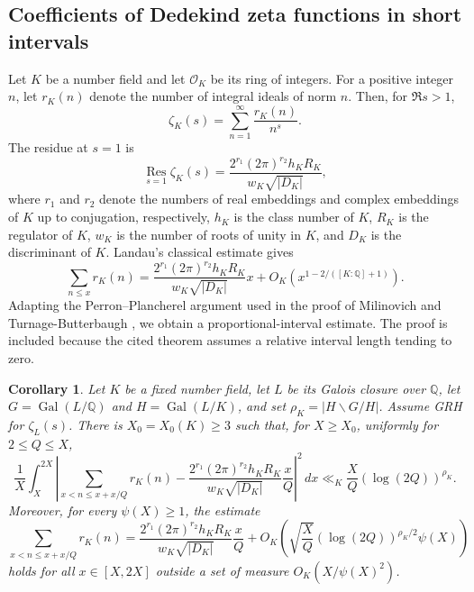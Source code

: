 \documentclass[twoside,reqno,11pt,a4paper]{amsart}
\numberwithin{equation}{section}
\theoremstyle{plain}
\newtheorem{cor}[thm]{Corollary}
\theoremstyle{definition}
\theoremstyle{remark}
\DeclareMathOperator{\Gal}{Gal}
\renewcommand{\le}{\leqslant}
\renewcommand{\ge}{\geqslant}
\begin{document}
\subsection{Coefficients of Dedekind zeta functions in short intervals}
Let $K$ be a number field and let $\mathcal O_K$ be its ring of integers. For a positive integer $n$, let $r_K(n)$ denote the number of integral ideals of norm $n$. Then, for $\Re s>1$,
\begin{equation}\label{Dedekind-zeta-dirichlet-series}
        \zeta_K(s)=\sum_{n=1}^{\infty}\frac{r_K(n)}{n^s}.
\end{equation}
The residue at $s=1$ is
\begin{equation}\label{eq:class-number-formula}
        \operatorname*{Res}_{s=1}\zeta_K(s)
        =
        \frac{2^{r_1}(2\pi)^{r_2}h_KR_K}
        {w_K\sqrt{|D_K|}},
\end{equation}
where $r_1$ and $r_2$ denote the numbers of real embeddings and complex embeddings of $K$ up to conjugation, respectively, $h_K$ is the class number of $K$, $R_K$ is the regulator of $K$, $w_K$ is the number of roots of unity in $K$, and $D_K$ is the discriminant of $K$. Landau's classical estimate \cite{Landau} gives
\begin{equation*}
        \sum_{n\le  x}r_K(n)
        =
        \frac{2^{r_1}(2\pi)^{r_2}h_KR_K}
        {w_K\sqrt{|D_K|}}x
        +O_K\left(x^{1-2/([K:\mathbb Q]+1)}\right).
\end{equation*}
Adapting the Perron--Plancherel argument used in the proof of Milinovich and Turnage-Butterbaugh \cite[Theorem~1.4]{M-T}, we obtain a proportional-interval estimate. The proof is included because the cited theorem assumes a relative interval length tending to zero.

\begin{cor}\label{short-interval-nongalois}
Let $K$ be a fixed number field, let $L$ be its Galois closure over $\mathbb Q$, let $G=\Gal(L/\mathbb Q)$ and $H=\Gal(L/K)$, and set $\rho_K=|H\backslash G/H|$. Assume GRH for $\zeta_L(s)$. There is $X_0=X_0(K)\ge3$ such that, for $X\ge X_0$, uniformly for $2\le Q\le X$,
\begin{equation*}
        \frac1X\int_X^{2X}
        \left|
        \sum_{x<n\le x+x/Q}r_K(n)
        -
        \frac{2^{r_1}(2\pi)^{r_2}h_KR_K}
        {w_K\sqrt{|D_K|}}\frac{x}{Q}
        \right|^2\,dx
        \ll_K
        \frac{X}{Q}\left(\log(2Q)\right)^{\rho_K}.
\end{equation*}
Moreover, for every $\psi(X)\ge1$, the estimate
\begin{equation*}
        \sum_{x<n\le x+x/Q}r_K(n)
        =
        \frac{2^{r_1}(2\pi)^{r_2}h_KR_K}
        {w_K\sqrt{|D_K|}}\frac{x}{Q}
        +
        O_K\left(
        \sqrt{\frac{X}{Q}}\left(\log(2Q)\right)^{\rho_K/2}\psi(X)
        \right)
\end{equation*}
holds for all $x\in[X,2X]$ outside a set of measure $O_K(X/\psi(X)^2)$.
\end{cor}
\end{document}
